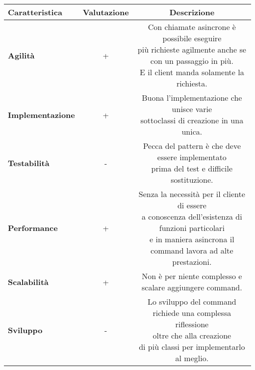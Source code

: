 {{{\begin{itemize}
				\small %
				{\renewcommand\arraystretch{1.2} %
					\begin{center} \begin{tabular}{|l|c|c|}
						\hline
						{\textbf{Caratteristica}}&{\textbf{Valutazione}}&{\textbf{Descrizione}}\\
						\hline
						\textbf{Agilità} & + &  \minitab[c]{Con chiamate asincrone è possibile eseguire\\più richieste agilmente anche se con un passaggio in più.\\E il client manda solamente la richiesta.} \\
						\hline
						\textbf{Implementazione} & + &  \minitab[c]{Buona l'implementazione che unisce varie\\sottoclassi di creazione in una unica.}\\
						\hline
						\textbf{Testabilità} & - &  \minitab[c]{Pecca del pattern è che deve essere implementato\\prima del test e difficile sostituzione.}\\
						\hline
						\textbf{Performance} & + &   \minitab[c]{Senza la necessità per il cliente di essere\\a conoscenza dell'esistenza di funzioni particolari\\e in maniera asincrona il command lavora ad alte prestazioni.} \\
						\hline
						\textbf{Scalabilità} & + &  Non è per niente complesso e scalare aggiungere command. \\
						\hline
						\textbf{Sviluppo} & - &  \minitab[c]{Lo sviluppo del command richiede una complessa riflessione\\ oltre che alla creazione\\di più classi per implementarlo al meglio.}\\
						\hline
					\end{tabular} \end{center}
				}
			\end{itemize}
		}
	}
}